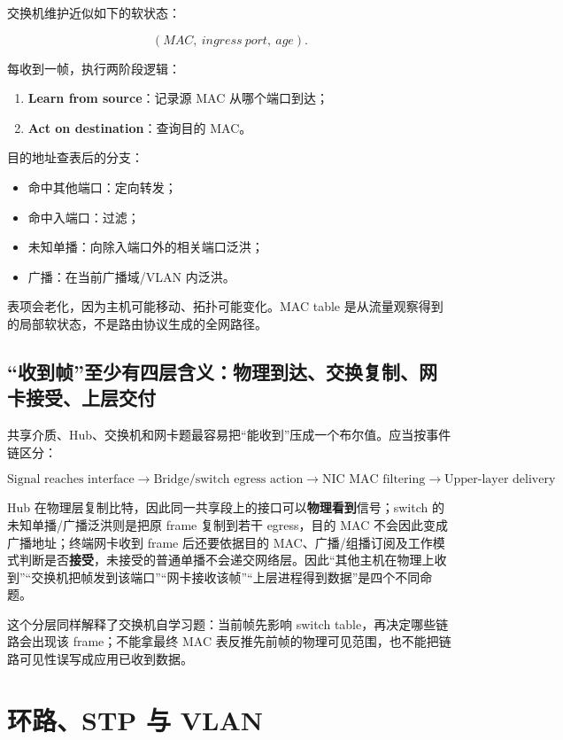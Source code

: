 \documentclass[UTF8,fontset=none,11pt,a4paper]{ctexart}
\providecommand{\tightlist}{\setlength{\itemsep}{0pt}\setlength{\parskip}{0pt}}
\begin{document}
交换机维护近似如下的软状态：

\[
(MAC,\ ingress\ port,\ age).
\]

每收到一帧，执行两阶段逻辑：

\begin{enumerate}
\def\labelenumi{\arabic{enumi}.}
\tightlist
\item
  \textbf{Learn from source}：记录源 MAC 从哪个端口到达；
\item
  \textbf{Act on destination}：查询目的 MAC。
\end{enumerate}

目的地址查表后的分支：

\begin{itemize}
\tightlist
\item
  命中其他端口：定向转发；
\item
  命中入端口：过滤；
\item
  未知单播：向除入端口外的相关端口泛洪；
\item
  广播：在当前广播域/VLAN 内泛洪。
\end{itemize}

表项会老化，因为主机可能移动、拓扑可能变化。MAC table
是从流量观察得到的局部软状态，不是路由协议生成的全网路径。

\subsection{“收到帧”至少有四层含义：物理到达、交换复制、网卡接受、上层交付}

共享介质、Hub、交换机和网卡题最容易把“能收到”压成一个布尔值。应当按事件链区分：

\[
\boxed{\text{Signal reaches interface}\to\text{Bridge/switch egress action}\to\text{NIC MAC filtering}\to\text{Upper-layer delivery}}
\]

Hub 在物理层复制比特，因此同一共享段上的接口可以\textbf{物理看到}信号；switch 的未知单播/广播泛洪则是把原 frame 复制到若干 egress，目的 MAC 不会因此变成广播地址；终端网卡收到 frame 后还要依据目的 MAC、广播/组播订阅及工作模式判断是否\textbf{接受}，未接受的普通单播不会递交网络层。因此“其他主机在物理上收到”“交换机把帧发到该端口”“网卡接收该帧”“上层进程得到数据”是四个不同命题。

这个分层同样解释了交换机自学习题：当前帧先影响 switch table，再决定哪些链路会出现该 frame；不能拿最终 MAC 表反推先前帧的物理可见范围，也不能把链路可见性误写成应用已收到数据。

\section{环路、STP 与 VLAN}\label{8-ux73afux8defstp-ux4e0e-vlan}
\end{document}

